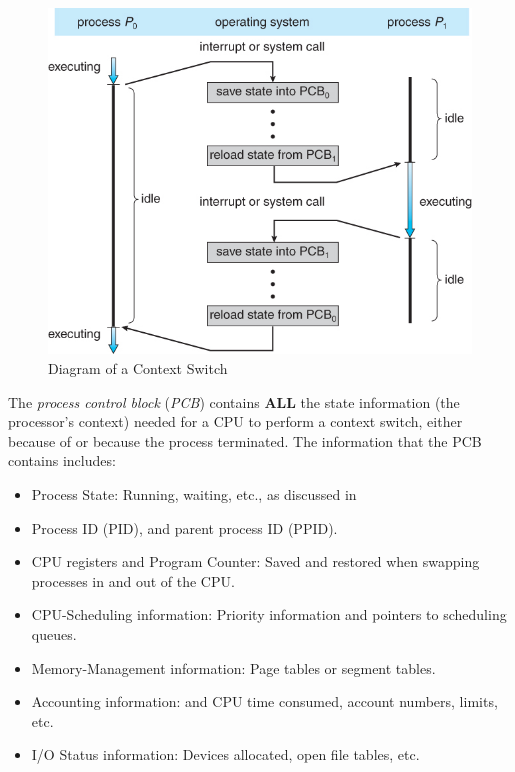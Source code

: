 \begin{figure}[h!tbp]
  \centering
  \includegraphics[scale=0.85]{./Drawings/EDAF35-Operating_Systems/Context_Switch.jpg}
  \caption{Diagram of a Context Switch}
  \label{fig:Context_Switch}
\end{figure}

\begin{definition}\label{def:Process_Control_Block}
  The \emph{process control block} (\emph{PCB}) contains \textbf{ALL} the state information (the processor's context) needed for a CPU to perform a context switch, either because of  or because the process terminated.
  The information that the PCB contains includes:
  \begin{itemize}[noitemsep]
  \item Process State: Running, waiting, etc., as discussed in 
  \item Process ID (PID), and parent process ID (PPID).\@
  \item CPU registers and Program Counter: Saved and restored when swapping processes in and out of the CPU.\@
  \item CPU-Scheduling information: Priority information and pointers to scheduling queues.
  \item Memory-Management information: Page tables or segment tables.
  \item Accounting information:  and  CPU time consumed, account numbers, limits, etc.
  \item I/O Status information: Devices allocated, open file tables, etc.
  \end{itemize}
\end{definition}

